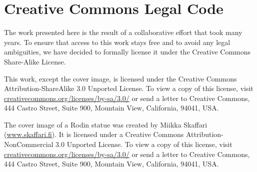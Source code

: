 \section{Creative Commons Legal Code}
\label{sec:cc}        

The work presented here is the result of a collaborative effort
that took many years.  To ensure that access to this work stays free
and to avoid any legal ambiguities, we have decided to formally license
it under the Creative Commons Share-Alike License.

This work, except the cover image, is licensed under the Creative Commons Attribution-ShareAlike 3.0 Unported License. To view a copy of this license, visit \href{http://creativecommons.org/licenses/by-sa/3.0/}{creative\-com\-mons.org/\-licenses/\-by-sa/3.0/} or send a letter to Creative Commons, 444 Castro Street, Suite 900, Mountain View, California, 94041, USA.

The cover image of a Rodin statue was created by Miikka Skaffari (\href{http://www.skaffari.fi/}{www.skaffari.fi}).  It is licensed under a Creative Commons Attribution-NonCommercial 3.0 Unported License.  To view a copy of this license, visit \href{http://creativecommons.org/licenses/by-sa/3.0/}{creative\-com\-mons.org/\-licenses/\-by-sa/3.0/} or send a letter to Creative Commons, 444 Castro Street, Suite 900, Mountain View, California, 94041, USA.


